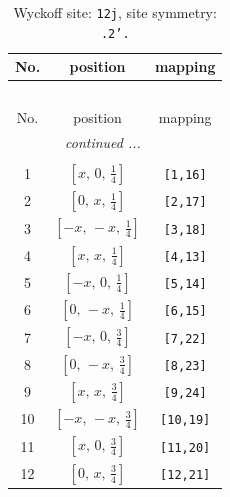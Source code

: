 \documentclass[fleqn,8pt]{jsarticle}
\begin{document}
\begin{longtable}{ccc}
\caption{Wyckoff site: {\tt 12j}, site symmetry: {\tt .2'.}}
 \\
 \hline \hline
No. & position & mapping \\ \hline \endfirsthead

\multicolumn{2}{l}{\tablename\ \thetable{}} \\
 \hline \hline
No. & position & mapping \\ \hline \endhead

 \hline \hline
\multicolumn{2}{r}{\footnotesize\it continued ...} \\ \endfoot

 \hline \hline
\multicolumn{2}{r}{} \\ \endlastfoot

1 & $\left[ x,\, 0,\, \frac{1}{4} \right]$ & {\tt [1,16]} \\ \hline
2 & $\left[ 0,\, x,\, \frac{1}{4} \right]$ & {\tt [2,17]} \\ \hline
3 & $\left[ - x,\, - x,\, \frac{1}{4} \right]$ & {\tt [3,18]} \\ \hline
4 & $\left[ x,\, x,\, \frac{1}{4} \right]$ & {\tt [4,13]} \\ \hline
5 & $\left[ - x,\, 0,\, \frac{1}{4} \right]$ & {\tt [5,14]} \\ \hline
6 & $\left[ 0,\, - x,\, \frac{1}{4} \right]$ & {\tt [6,15]} \\ \hline
7 & $\left[ - x,\, 0,\, \frac{3}{4} \right]$ & {\tt [7,22]} \\ \hline
8 & $\left[ 0,\, - x,\, \frac{3}{4} \right]$ & {\tt [8,23]} \\ \hline
9 & $\left[ x,\, x,\, \frac{3}{4} \right]$ & {\tt [9,24]} \\ \hline
10 & $\left[ - x,\, - x,\, \frac{3}{4} \right]$ & {\tt [10,19]} \\ \hline
11 & $\left[ x,\, 0,\, \frac{3}{4} \right]$ & {\tt [11,20]} \\ \hline
12 & $\left[ 0,\, x,\, \frac{3}{4} \right]$ & {\tt [12,21]} \\
\end{longtable}
\renewcommand{\arraystretch}{1.2}
\end{document}
